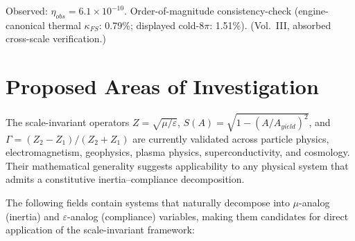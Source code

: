 Observed: $\eta_{obs} = 6.1 \times 10^{-10}$. Order-of-magnitude consistency-check (engine-canonical thermal $\kappa_{FS}$: 0.79\%; displayed cold-$8\pi$: 1.51\%). %
(Vol.~III, absorbed cross-scale verification.)


\section{Proposed Areas of Investigation}
\label{sec:proposed_investigations}

The scale-invariant operators $Z = \sqrt{\mu/\varepsilon}$,
$S(A) = \sqrt{1 - (A/A_{yield})^2}$, and
$\Gamma = (Z_2 - Z_1)/(Z_2 + Z_1)$ are currently validated across
particle physics, electromagnetism, geophysics, plasma physics,
superconductivity, and cosmology.  Their mathematical generality
suggests applicability to any physical system that admits a
constitutive inertia--compliance decomposition.

The following fields contain systems that naturally decompose into
$\mu$-analog (inertia) and $\varepsilon$-analog (compliance)
variables, making them candidates for direct application of the
scale-invariant framework:

